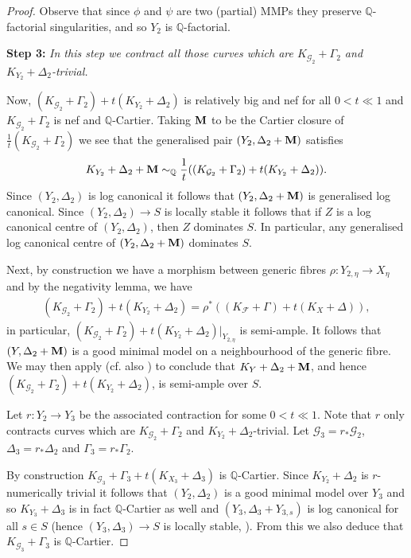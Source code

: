 \documentclass[12pt, a4paper]{amsart}
\newcounter{Theorem}
\theoremstyle{definition}
\theoremstyle{named}
\begin{document}
\begin{proof}
Observe that since $\phi$ and $\psi$ are two (partial) MMPs they preserve $\mathbb Q$-factorial singularities, and so $Y_2$ is $\mathbb Q$-factorial.



\medskip

{\bf Step 3: }{\it In this step we contract all those curves which are 
$K_{\mathcal G_2}+\Gamma_2$ and $K_{Y_2}+\Delta_2$-trivial.}

Now, $(K_{\mathcal G_2}+\Gamma_2)+t(K_{Y_2}+\Delta_2)$ is relatively big and nef for all $0<t \ll1$
and $K_{\mathcal G_2}+\Gamma_2$ is nef and $\mathbb Q$-Cartier.
Taking ${\bf M}$ to be the Cartier closure of  $\frac{1}{t}(K_{\mathcal G_2}+\Gamma_2)$
we see that the generalised pair $(Y_2, \Delta_2+{\bf M})$ satisfies
\begin{align*}K_{Y_2}+\Delta_2+{\bf M} \sim_{\mathbb Q} \frac{1}{t}((K_{\mathcal G_2}+\Gamma_2)+t(K_{Y_2}+\Delta_2)).\end{align*}
Since $(Y_2, \Delta_2)$ is log canonical 
it follows that $(Y_2, \Delta_2+{\bf M})$
is generalised log canonical.
Since $(Y_2, \Delta_2) \rightarrow S$ is locally stable it follows that if $Z$ is a log canonical centre 
of $(Y_2, \Delta_2)$, then $Z$ dominates $S$. In particular, any generalised log canonical centre of $(Y_2, \Delta_2+{\bf M})$ dominates $S$.

Next, by construction we have a morphism between generic fibres 
$\rho\colon Y_{2, \eta} \rightarrow X_{\eta}$ and by the negativity lemma, \cite[Lemma 3.38]{KM98}  we have \begin{align*}(K_{\mathcal G_2}+\Gamma_2)+t(K_{Y_2}+\Delta_2) = \rho^*((K_{\mathcal F}+\Gamma)+t(K_X+\Delta)),\end{align*} 
in particular, $(K_{\mathcal G_2}+\Gamma_2)+t(K_{Y_2}+\Delta_2)\vert_{Y_{2, \eta}}$ is semi-ample. 
It follows that $(Y, \Delta_2+{\bf M})$ 
is a good minimal model on a neighbourhood of the generic fibre. We may then apply 
\cite[Theorem 1.3]{MR4596359} (cf. also \cite[Theorem 5.1]{MR4596359})
to conclude that 
$K_Y+\Delta_2+{\bf M}$, and hence $(K_{\mathcal G_2}+\Gamma_2)+t(K_{Y_2}+\Delta_2)$, is semi-ample over $S$.

Let $r\colon Y_2 \rightarrow Y_3$ be the associated contraction for some $0<t \ll 1$.
Note that $r$ only contracts curves which are $K_{\mathcal G_2}+\Gamma_2$ and $K_{Y_2}+\Delta_2$-trivial.
Let $\mathcal G_3 = r_*\mathcal G_2$, 
$\Delta_3 = r_*\Delta_2$ and $\Gamma_3 = r_*\Gamma_2$.

By construction $K_{\mathcal G_3}+\Gamma_3+t(K_{X_3}+\Delta_3)$
is $\mathbb Q$-Cartier. Since $K_{Y_2}+\Delta_2$ is $r$-numerically trivial it follows that $(Y_2, \Delta_2)$ is a good minimal model over $Y_3$ and so $K_{Y_3}+\Delta_3$
is in fact $\mathbb Q$-Cartier as well and $(Y_3, \Delta_3+Y_{3, s})$
is log canonical for all $s \in S$ (hence $(Y_3, \Delta_3) \to S$ is locally stable, \cite[Definition-Theorem 2.3]{modbook}).
From this we also deduce that $K_{\mathcal G_3}+\Gamma_3$ is $\mathbb Q$-Cartier.


\end{proof}
\end{document}
